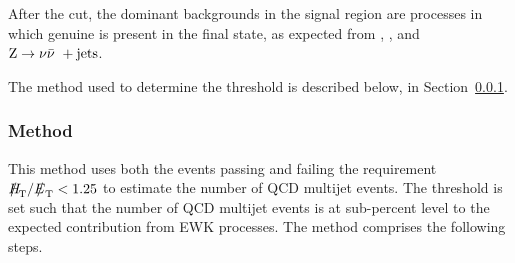 After the \alphat cut, the dominant backgrounds in the signal region are processes in which genuine \met is present in the final state, as expected from \wj, \ttbar, and ${\text Z} \rightarrow \nu\bar{\nu}\ + \textrm{jets}$.

The method used to determine the \alphat threshold is described below, in Section~\ref{sec:qcd-method}.

\subsubsection{Method}
\label{sec:qcd-method}
This method uses both the events passing and failing the requirement $\mhtmet < 1.25$ to estimate the number of QCD multijet events. The \alphat threshold is set such that the number of QCD multijet events is at sub-percent level to the expected contribution from EWK processes. The method comprises the following steps.

